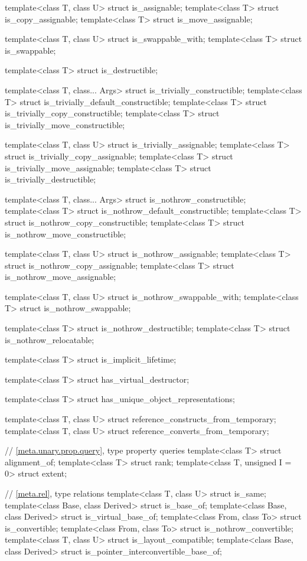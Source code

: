 \begin{codeblock}
{  template<class T, class U> struct is_assignable;
  template<class T> struct is_copy_assignable;
  template<class T> struct is_move_assignable;

  template<class T, class U> struct is_swappable_with;
  template<class T> struct is_swappable;

  template<class T> struct is_destructible;

  template<class T, class... Args> struct is_trivially_constructible;
  template<class T> struct is_trivially_default_constructible;
  template<class T> struct is_trivially_copy_constructible;
  template<class T> struct is_trivially_move_constructible;

  template<class T, class U> struct is_trivially_assignable;
  template<class T> struct is_trivially_copy_assignable;
  template<class T> struct is_trivially_move_assignable;
  template<class T> struct is_trivially_destructible;

  template<class T, class... Args> struct is_nothrow_constructible;
  template<class T> struct is_nothrow_default_constructible;
  template<class T> struct is_nothrow_copy_constructible;
  template<class T> struct is_nothrow_move_constructible;

  template<class T, class U> struct is_nothrow_assignable;
  template<class T> struct is_nothrow_copy_assignable;
  template<class T> struct is_nothrow_move_assignable;

  template<class T, class U> struct is_nothrow_swappable_with;
  template<class T> struct is_nothrow_swappable;

  template<class T> struct is_nothrow_destructible;
  template<class T> struct is_nothrow_relocatable;

  template<class T> struct is_implicit_lifetime;

  template<class T> struct has_virtual_destructor;

  template<class T> struct has_unique_object_representations;

  template<class T, class U> struct reference_constructs_from_temporary;
  template<class T, class U> struct reference_converts_from_temporary;

  // \ref{meta.unary.prop.query}, type property queries
  template<class T> struct alignment_of;
  template<class T> struct rank;
  template<class T, unsigned I = 0> struct extent;

  // \ref{meta.rel}, type relations
  template<class T, class U> struct is_same;
  template<class Base, class Derived> struct is_base_of;
  template<class Base, class Derived> struct is_virtual_base_of;
  template<class From, class To> struct is_convertible;
  template<class From, class To> struct is_nothrow_convertible;
  template<class T, class U> struct is_layout_compatible;
  template<class Base, class Derived> struct is_pointer_interconvertible_base_of;

}
\end{codeblock}

